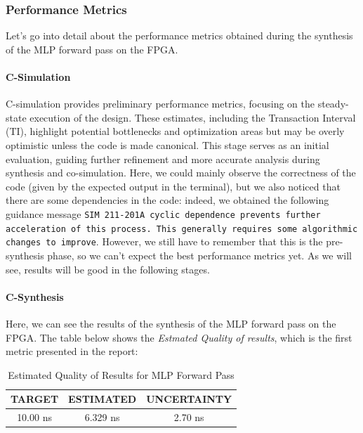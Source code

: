 \documentclass{article}
\begin{document}
\subsubsection{Performance Metrics}
Let's go into detail about the performance metrics obtained during the synthesis of the MLP forward pass on the FPGA.

\paragraph{C-Simulation}  
C-simulation provides preliminary performance metrics, focusing on the steady-state execution of the design. These estimates, including the Transaction Interval (TI), highlight potential bottlenecks and optimization areas but may be overly optimistic unless the code is made canonical. This stage serves as an initial evaluation, guiding further refinement and more accurate analysis during synthesis and co-simulation.  
Here, we could mainly observe the correctness of the code (given by the expected output in the terminal), but we also noticed that there are some dependencies in the code: indeed, we obtained the following guidance message \texttt{SIM 211-201A cyclic dependence prevents further acceleration of this process. This generally requires some algorithmic changes to improve}. However, we still have to remember that this is the pre-synthesis phase, so we can't expect the best performance metrics yet. As we will see, results will be good in the following stages. 


\paragraph{C-Synthesis}
Here, we can see the results of the synthesis of the MLP forward pass on the FPGA. The table below shows the \textit{Estmated Quality of results}, which is the first metric presented in the report:

\begin{table}[H]
    \centering
    \begin{tabular}{|c|c|c|}
        \hline
        \textbf{TARGET} & \textbf{ESTIMATED} & \textbf{UNCERTAINTY} \\
        \hline
        10.00 ns & 6.329 ns & 2.70 ns \\
        \hline
    \end{tabular}
    \caption{\centering Estimated Quality of Results for MLP Forward Pass}
    \label{tab:mlp-quality}
\end{table}
\end{document}
